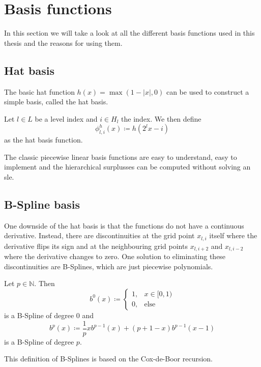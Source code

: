 \documentclass[
  a4paper,  %
  twoside,  %
  bibliography=totoc,
  headsepline,
  cleardoublepage=empty,
  parskip=half,
  draft=false
]{scrbook}
\begin{document}
\section{Basis functions}

In this section we will take a look at all the different basis functions used in this thesis and the reasons for using them.

\subsection{Hat basis}

The basic hat function $h(x)=\max(1 - |x|,0)$ can be used to construct a simple basis, called the hat basis.
\begin{definition}
Let $l \in L$ be a level index and $i \in H_l$ the index.
We then define
\begin{equation}
\phi^h_{l,i}(x) \coloneqq h(2^lx-i)
\end{equation}
as the hat basis function.
\end{definition}
The classic piecewise linear basis functions are easy to understand, easy to implement and the hierarchical surplusses can be computed without solving an sle.

\subsection{B-Spline basis}

One downside of the hat basis is that the functions do not have a continuous derivative.
Instead, there are discontinuities at the grid point $x_{l,i}$ itself where the derivative flips its sign and at the neighbouring grid points $x_{l,i+2}$ and $x_{l,i-2}$ where the derivative changes to zero.
One solution to eliminating these discontinuities are B-Splines, which are just piecewise polynomials.
\begin{definition}[B-Splines]
Let $p \in \mathds{N}$.
Then
\begin{equation}
b^0(x) \coloneqq
\begin{cases}
    1, & x \in [0,1) \\
   0, & \text{else}
\end{cases}
\end{equation}
is a B-Spline of degree $0$ and
\begin{equation}
b^p(x) \coloneqq \frac{1}{p} xb^{p-1}(x) + (p + 1 - x) b^{p-1}(x-1) 
\end{equation}
is a B-Spline of degree $p$.
\end{definition}
This definition of B-Splines is based on the Cox-de-Boor recursion.
\end{document}
